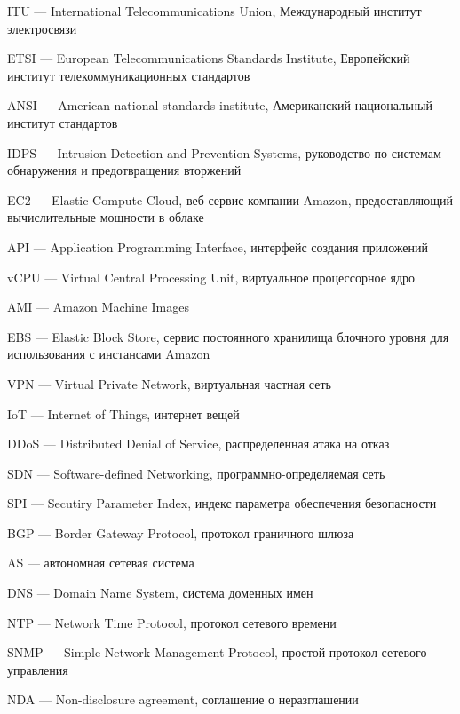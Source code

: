 \hypertarget{itu}{ITU --- International Telecommunications Union, Международный институт электросвязи}

\clearpage

\hypertarget{etsi}{ETSI --- European Telecommunications Standards Institute, Европейский институт телекоммуникационных стандартов}

\hypertarget{ansi}{ANSI --- American national standards institute, Американский национальный институт стандартов}

\hypertarget{idps}{IDPS --- Intrusion Detection and Prevention Systems, руководство по системам обнаружения и предотвращения вторжений}

\hypertarget{ec2}{EC2 --- Elastic Compute Cloud, веб-сервис компании Amazon, предоставляющий вычислительные мощности в облаке}

\hypertarget{api}{API --- Application Programming Interface, интерфейс создания приложений}

\hypertarget{vcpu}{vCPU --- Virtual Central Processing Unit, виртуальное процессорное ядро}

\hypertarget{ami}{AMI --- Amazon Machine Images}

\hypertarget{ebs}{EBS --- Elastic Block Store, сервис постоянного хранилища блочного уровня для использования с инстансами Amazon}

\hypertarget{vpn}{VPN --- Virtual Private Network, виртуальная частная сеть}

\hypertarget{iot}{IoT --- Internet of Things, интернет вещей}

\hypertarget{ddos}{DDoS --- Distributed Denial of Service, распределенная атака на отказ}

\hypertarget{sdn}{SDN --- Software-defined Networking, программно-определяемая сеть}

\hypertarget{spi}{SPI --- Secutiry Parameter Index, индекс параметра обеспечения безопасности}

\hypertarget{bgp}{BGP --- Border Gateway Protocol, протокол граничного шлюза}

\hypertarget{as}{AS --- автономная сетевая система}

\hypertarget{dns}{DNS --- Domain Name System, система доменных имен}

\hypertarget{ntp}{NTP --- Network Time Protocol, протокол сетевого времени}

\hypertarget{snmp}{SNMP --- Simple Network Management Protocol, простой протокол сетевого управления}

\hypertarget{nda}{NDA --- Non-disclosure agreement, соглашение о неразглашении}


